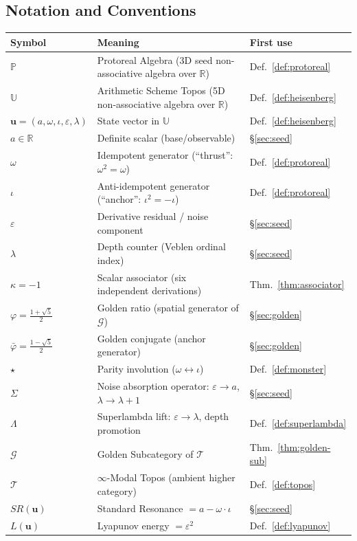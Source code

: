 \documentclass[12pt,oneside]{article}
\theoremstyle{principia}
\theoremstyle{definition}
\theoremstyle{remark}
\providecommand{\UU}{\mathbb{U}}
\providecommand{\PP}{\mathbb{P}}
\providecommand{\RR}{\mathbb{R}}
\providecommand{\GG}{\mathcal{G}}
\providecommand{\TT}{\mathcal{T}}
\providecommand{\vp}{\varphi}
\providecommand{\vpbar}{\bar{\varphi}}
\providecommand{\eps}{\varepsilon}
\providecommand{\lam}{\lambda}
\providecommand{\kap}{\kappa}
\begin{document}
\newpage

\subsection*{Notation and Conventions}

\begin{tabular}{@{}lll@{}}
\toprule
\textbf{Symbol} & \textbf{Meaning} & \textbf{First use} \\
\midrule
$\PP$ & Protoreal Algebra (3D seed non-associative algebra over $\RR$) & Def.~\ref{def:protoreal} \\
$\UU$ & Arithmetic Scheme Topos (5D non-associative algebra over $\RR$) & Def.~\ref{def:heisenberg} \\
$\mathbf{u} = (a, \omega, \iota, \eps, \lam)$ & State vector in $\UU$ & Def.~\ref{def:heisenberg} \\
$a \in \RR$ & Definite scalar (base/observable) & \S\ref{sec:seed} \\
$\omega$ & Idempotent generator (``thrust'': $\omega^2 = \omega$) & Def.~\ref{def:protoreal} \\
$\iota$ & Anti-idempotent generator (``anchor'': $\iota^2 = -\iota$) & Def.~\ref{def:protoreal} \\
$\eps$ & Derivative residual / noise component & \S\ref{sec:seed} \\
$\lam$ & Depth counter (Veblen ordinal index) & \S\ref{sec:seed} \\
$\kap = -1$ & Scalar associator (six independent derivations) & Thm.~\ref{thm:associator} \\
$\vp = \tfrac{1+\sqrt{5}}{2}$ & Golden ratio (spatial generator of $\GG$) & \S\ref{sec:golden} \\
$\vpbar = \tfrac{1-\sqrt{5}}{2}$ & Golden conjugate (anchor generator) & \S\ref{sec:golden} \\
$\star$ & Parity involution ($\omega \leftrightarrow \iota$) & Def.~\ref{def:monster} \\
$\Sigma$ & Noise absorption operator: $\eps \to a$, $\lam \to \lam+1$ & \S\ref{sec:seed} \\
$\Lambda$ & Superlambda lift: $\eps \to \lam$, depth promotion & Def.~\ref{def:superlambda} \\
$\GG$ & Golden Subcategory of $\TT$ & Thm.~\ref{thm:golden-sub} \\
$\TT$ & $\infty$-Modal Topos (ambient higher category) & Def.~\ref{def:topos} \\
$SR(\mathbf{u})$ & Standard Resonance $= a - \omega \cdot \iota$ & \S\ref{sec:seed} \\
$L(\mathbf{u})$ & Lyapunov energy $= \eps^2$ & Def.~\ref{def:lyapunov} \\
\bottomrule
\end{tabular}
\end{document}
